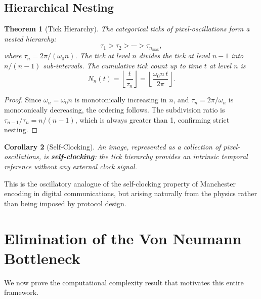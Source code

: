 \documentclass[11pt,twocolumn,a4paper]{article}
\newtheorem{theorem}{Theorem}[section]
\newtheorem{corollary}[theorem]{Corollary}
\begin{document}
\subsection{Hierarchical Nesting}

\begin{theorem}[Tick Hierarchy]\label{thm:tick_hierarchy}
The categorical ticks of pixel-oscillations form a nested hierarchy:
\begin{equation}
    \tau_1 > \tau_2 > \cdots > \tau_{n_{\max}},
\end{equation}
where $\tau_n = 2\pi / (\omega_0 n)$. The tick at level $n$ divides the tick at level $n-1$ into $n/(n-1)$ sub-intervals. The cumulative tick count up to time $t$ at level $n$ is
\begin{equation}
    N_n(t) = \left\lfloor \frac{t}{\tau_n} \right\rfloor = \left\lfloor \frac{\omega_0 n \, t}{2\pi} \right\rfloor.
    \label{eq:cumulative_ticks}
\end{equation}
\end{theorem}

\begin{proof}
Since $\omega_n = \omega_0 n$ is monotonically increasing in $n$, and $\tau_n = 2\pi/\omega_n$ is monotonically decreasing, the ordering follows. The subdivision ratio is $\tau_{n-1}/\tau_n = n/(n-1)$, which is always greater than 1, confirming strict nesting.
\end{proof}

\begin{corollary}[Self-Clocking]\label{cor:self_clocking}
An image, represented as a collection of pixel-oscillations, is \textbf{self-clocking}: the tick hierarchy provides an intrinsic temporal reference without any external clock signal.
\end{corollary}

This is the oscillatory analogue of the self-clocking property of Manchester encoding in digital communications, but arising naturally from the physics rather than being imposed by protocol design.

\section{Elimination of the Von Neumann Bottleneck}\label{sec:vonneumann}

We now prove the computational complexity result that motivates this entire framework.
\end{document}

